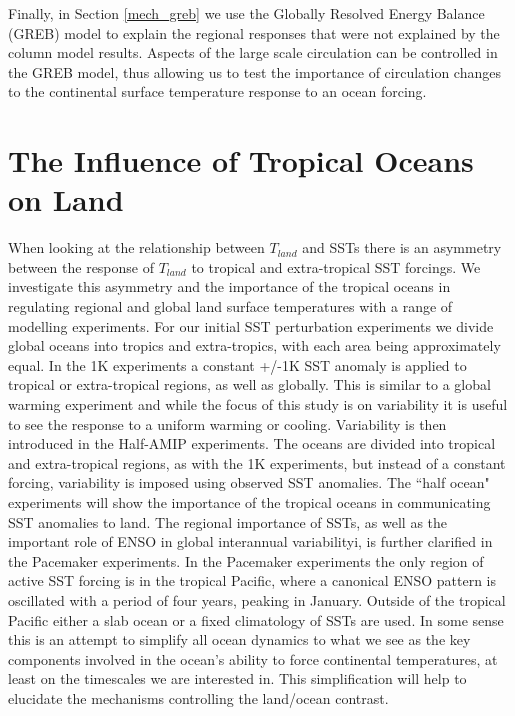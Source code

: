 Finally, in Section \ref{mech_greb} we use the Globally Resolved Energy Balance 
(GREB) model to explain the regional responses that were not explained by the 
column model results. Aspects of the large scale circulation can be controlled 
in the GREB model, thus allowing us to test the importance of circulation 
changes to the continental surface temperature response to an ocean forcing.



\section{The Influence of Tropical Oceans on Land}
\label{mech_inftrop}

When looking at the relationship between $T_{land}$ and SSTs there is an 
asymmetry between the response of $T_{land}$ to tropical and extra-tropical SST 
forcings. We investigate this asymmetry and the importance of the tropical 
oceans in regulating regional and global land surface temperatures with a range 
of modelling experiments. For our initial SST perturbation experiments we divide 
global oceans into tropics and extra-tropics, with each area being approximately 
equal.  In the 1K experiments a constant +/-1K SST anomaly is applied to 
tropical or extra-tropical regions, as well as globally. This is similar to a 
global warming experiment and while the focus of this study is on variability it 
is useful to see the response to a uniform warming or cooling.  Variability is 
then introduced in the Half-AMIP experiments. The oceans are divided into 
tropical and extra-tropical regions, as with the 1K experiments, but instead of 
a constant forcing, variability is imposed using observed SST anomalies. The 
``half ocean" experiments will show the importance of the tropical oceans in 
communicating SST anomalies to land. The regional importance of SSTs, as well as 
the important role of ENSO in global interannual variabilityi, is further 
clarified in the Pacemaker experiments. In the Pacemaker experiments the only 
region of active SST forcing is in the tropical Pacific, where a canonical ENSO 
pattern is oscillated with a period of four years, peaking in January. Outside 
of the tropical Pacific either a slab ocean or a fixed climatology of SSTs are 
used.  In some sense this is an attempt to simplify all ocean dynamics to what 
we see as the key components involved in the ocean's ability to force 
continental temperatures, at least on the timescales we are interested in. This 
simplification will help to elucidate the mechanisms controlling the land/ocean 
contrast.

